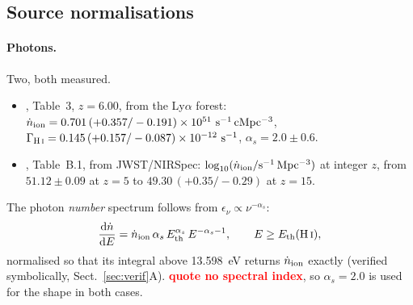 \documentclass[11pt,a4paper]{article}
\newcommand{\flag}[1]{\textbf{\textcolor{red}{#1}}}
\begin{document}
\subsection{Source normalisations}
\paragraph{Photons.}
Two, both measured.
\begin{itemize}\itemsep2pt
  \item \citet{Gaikwad2023}, Table~3, $z=6.00$, from the Ly$\alpha$ forest:
  $\dot n_{\rm ion} = 0.701\,(+0.357/-0.191)\times10^{51}\
  {\rm s^{-1}\,cMpc^{-3}}$,
  $\Gamma_{\rm H\,\textsc{i}} = 0.145\,(+0.157/-0.087)\times10^{-12}\
  {\rm s^{-1}}$, $\alpha_s = 2.0\pm0.6$.
  \item \citet{Giovinazzo2026}, Table~B.1, from JWST/NIRSpec:
  $\log_{10}(\dot n_{\rm ion}/{\rm s^{-1}\,Mpc^{-3}})$ at integer $z$, from
  $51.12\pm0.09$ at $z=5$ to $49.30\,(+0.35/-0.29)$ at $z=15$.
\end{itemize}
The photon \emph{number} spectrum follows from $\epsilon_\nu\propto
\nu^{-\alpha_s}$:
\begin{equation}
  \frac{{\rm d}\dot n}{{\rm d}E} =
  \dot n_{\rm ion}\,\alpha_s\,E_{\rm th}^{\alpha_s}\,E^{-\alpha_s-1},
  \qquad E \ge E_{\rm th}({\rm H\,\textsc{i}}),
  \label{eq:phspec}
\end{equation}
normalised so that its integral above 13.598~eV returns $\dot n_{\rm ion}$
exactly (verified symbolically, Sect.~\ref{sec:verif}A).
\flag{\citet{Giovinazzo2026} quote no spectral index}, so $\alpha_s = 2.0$ is
used for the shape in both cases.
\end{document}
